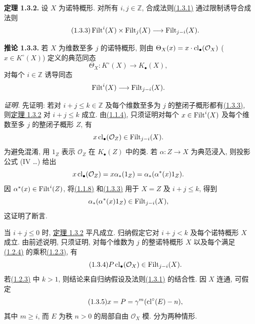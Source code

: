 \textbf{定理 1.3.2.} 设 $X$ 为诺特概形. 对所有 $i,j\in\mathbb Z$, 合成法则\hyperlink{sga6.e10.eq.1-3-1}{(1.3.1)} 通过限制诱导合成法则
%
%
\begin{equation}\tag{1.3.3}
\operatorname{Filt}^i(X)\times\operatorname{Filt}_j(X)\longrightarrow\operatorname{Filt}_{j-i}(X).
\end{equation}

\textbf{推论 1.3.3.} 若 $X$ 为维数至多 $j$ 的诺特概形, 则由 $\Theta_X(x)=x\cdot\operatorname{cl}_\bullet(\mathcal O_X)$ ($x\in K^\circ(X)$) 定义的典范同态
%
%
\[
\Theta_X:K^\circ(X)\longrightarrow K_\bullet(X),
\]
对每个 $i\in\mathbb Z$ 诱导同态
%
\[
\operatorname{Filt}^i(X)\longrightarrow\operatorname{Filt}_{j-i}(X).
\]

\emph{证明.} 先证明: 若对 $i+j\leq k\in\mathbb Z$ 及每个维数至多为 $j$ 的整闭子概形都有\hyperlink{sga6.e10.cor.1-3-3}{(1.3.3)}, 则\hyperlink{sga6.e10.thm.1-3-2}{定理 1.3.2} 对 $i+j\leq k$ 成立. 由\hyperlink{sga6.e10.cor.1-1-4}{(1.1.4)}, 只须证明对每个 $x\in\operatorname{Filt}^i(X)$ 及每个维数至多 $j$ 的整闭子概形 $Z$, 有
%
%
%
%
%
\[
x\operatorname{cl}_\bullet(\mathcal O_Z)\in\operatorname{Filt}_{j-i}(X).
\]
为避免混淆, 用 $1_Z$ 表示 $\mathcal O_Z$ 在 $K_\bullet(Z)$ 中的类. 若 $\alpha:Z\to X$ 为典范浸入, 则投影公式 (IV \ldots) 给出
%
%
\[
x\operatorname{cl}_\bullet(\mathcal O_Z)
=x\alpha_*(1_Z)
=\alpha_*(\alpha^*(x)1_Z).
\]
因 $\alpha^*(x)\in\operatorname{Filt}^i(Z)$, 将\hyperlink{sga6.e10.prop.1-1-8}{(1.1.8)} 和\hyperlink{sga6.e10.cor.1-3-3}{(1.3.3)} 用于 $X=Z$ 及 $i+j\leq k$, 得到
%
\[
\alpha_*(\alpha^*(x)1_Z)\in\operatorname{Filt}_{j-i}(X),
\]
这证明了断言.

当 $i+j\leq0$ 时, \hyperlink{sga6.e10.thm.1-3-2}{定理 1.3.2} 平凡成立. 归纳假定它对 $i+j<k$ 及每个诺特概形 $X$ 成立. 由前述说明, 只须证明, 对每个维数为 $j$ 的整诺特概形 $X$ 以及每个满足\hyperlink{sga6.e10.eq.1-2-4}{(1.2.4)} 的乘积\hyperlink{sga6.e10.eq.1-2-3}{(1.2.3)}, 有
%
%
%
\begin{equation}\tag{1.3.4}
P\operatorname{cl}_\bullet(\mathcal O_X)\in\operatorname{Filt}_{j-i}(X).
\end{equation}
若\hyperlink{sga6.e10.eq.1-2-3}{(1.2.3)} 中 $k>1$, 则结论来自归纳假设及法则\hyperlink{sga6.e10.eq.1-3-1}{(1.3.1)} 的结合性. 因 $X$ 连通, 可假定
%
%
\begin{equation}\tag{1.3.5}
x=P=\gamma^m(\operatorname{cl}^\circ(E)-n),
\end{equation}
其中 $m\geq i$, 而 $E$ 为秩 $n>0$ 的局部自由 $\mathcal O_X$ 模. 分为两种情形.
%

